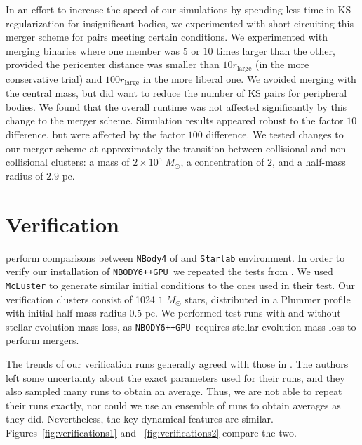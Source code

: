 \documentclass{princeton_astro_thesis}
\newcommand\Msun{\; M_\odot}
\newcommand\pc{\mbox{ pc}}
\newcommand\nbody{\texttt{NBODY6++GPU }}
\numberwithin{equation}{section}
\begin{document}
In an effort to increase the speed of our simulations by spending less time in KS regularization for insignificant bodies, we experimented with short-circuiting this merger scheme for pairs meeting certain conditions.  We experimented with merging binaries where one member was $5$ or $10$ times larger than the other, provided the pericenter distance was smaller than $10 r_\mathrm{large}$ (in the more conservative trial) and $100 r_\mathrm{large}$ in the more liberal one.  We avoided merging with the central mass, but did want to reduce the number of KS pairs for peripheral bodies. We found that the overall runtime was not affected significantly by this change to the merger scheme. Simulation results appeared robust to the factor $10$ difference, but were affected by the factor $100$ difference.  We tested changes to our merger scheme at approximately the transition between collisional and non-collisional clusters: a mass of $2 \times 10^5 \Msun$, a concentration of $2$, and a half-mass radius of $2.9 \pc$.

\section{Verification}
\citet{2009Anders, 2012Anders} perform comparisons between \texttt{NBody4} of \citet{1999Aarseth} and \texttt{Starlab} environment.  In order to verify our installation of \nbody we repeated the tests from \citet{2009Anders}.  We used \texttt{McLuster} to generate similar initial conditions to the ones used in their test. Our verification clusters consist of 1024 $1 \Msun$ stars, distributed in a Plummer profile with initial half-mass radius $0.5 \pc$.  We performed test runs with and without stellar evolution mass loss, as \nbody requires stellar evolution mass loss to perform mergers.

The trends of our verification runs generally agreed with those in \citet{2009Anders}.  The authors left some uncertainty about the exact parameters used for their runs, and they also sampled many runs to obtain an average. 
Thus, we are not able to repeat their runs exactly, nor could we use an ensemble of runs to obtain averages as they did.  Nevertheless, the key dynamical features are similar.
Figures~\ref{fig:verifications1} and ~\ref{fig:verifications2} compare the two.
\end{document}
